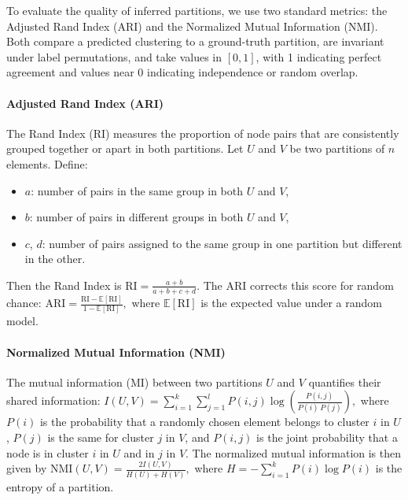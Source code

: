 \documentclass[reprint,onecolumn]{article}
\newcommand{\1}{\mathbb{1}}
\newcommand{\0}{\mathbf{0}}
\begin{document}
To evaluate the quality of inferred partitions, we use two standard metrics: the Adjusted Rand Index (ARI) and the Normalized Mutual Information (NMI). Both compare a predicted clustering to a ground-truth partition, are invariant under label permutations, and take values in \([0,1]\), with 1 indicating perfect agreement and values near 0 indicating independence or random overlap.


\paragraph{Adjusted Rand Index (ARI)}  
The Rand Index (RI) measures the proportion of node pairs that are consistently grouped together or apart in both partitions. Let \(U\) and \(V\) be two partitions of \(n\) elements. Define:
\begin{itemize}
    \item \(a\): number of pairs in the same group in both \(U\) and \(V\),
    \item \(b\): number of pairs in different groups in both \(U\) and \(V\),
    \item \(c\), \(d\): number of pairs assigned to the same group in one partition but different in the other.
\end{itemize}
Then the Rand Index is
\(
\mathrm{RI} = \frac{a + b}{a + b + c + d}.
\)
The ARI corrects this score for random chance:
\(
\mathrm{ARI} = \frac{\mathrm{RI} - \mathbb{E}[\mathrm{RI}]}{1 - \mathbb{E}[\mathrm{RI}]},
\)
where \(\mathbb{E}[\mathrm{RI}]\) is the expected value under a random model.

\paragraph{Normalized Mutual Information (NMI)}  
The mutual information (MI) between two partitions \(U\) and \(V\) quantifies their shared information:
\(
I(U, V) = \sum_{i=1}^{k} \sum_{j=1}^{l} P(i, j) \log \left( \frac{P(i, j)}{P(i)\,P(j)} \right),
\)
where \(P(i)\) is the probability that a randomly chosen element belongs to cluster \(i\) in \(U\), \(P(j)\) is the same for cluster \(j\) in \(V\), and \(P(i, j)\) is the joint probability that a node is in cluster \(i\) in \(U\) and in \(j\) in \(V\).
 The normalized mutual information is then given by
\(
\mathrm{NMI}(U, V) = \frac{2 I(U, V)}{H(U) + H(V)},
\)
where \(H = - \sum_{i=1}^{k} P(i) \log P(i)\) is the entropy of a partition.
\end{document}
